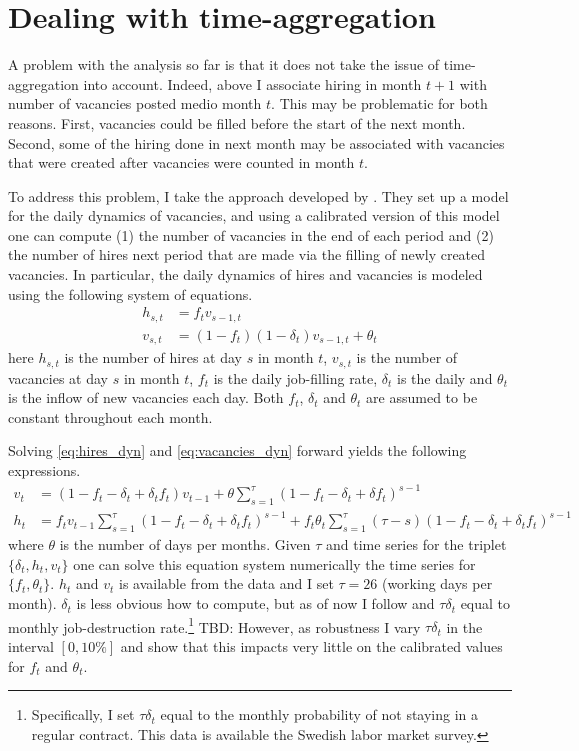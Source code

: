 \section{Dealing with time-aggregation}
\label{sec:time_agg}

A problem with the analysis so far is that it does not take the issue of time-aggregation into account. Indeed, above I associate hiring in month $t+1$ with number of vacancies posted medio month $t$. This may be problematic for both reasons. First, vacancies could be filled before the start of the next month. Second, some of the hiring done in next month may be associated with vacancies that were created after vacancies were counted in month $t$.

To address this problem, I take the approach developed by \cite{Davis2013}. They set up a model for the daily dynamics of vacancies, and using a calibrated version of this model one can compute (1) the number of vacancies in the end of each period and (2) the number of hires next period that are made via the filling of newly created vacancies. In particular, the daily dynamics of hires and vacancies is modeled using the following system of equations.
\begin{align}
h_{s,t}&=f_t v_{s-1,t} \label{eq:hires_dyn} \\
v_{s,t}&=(1-f_t)(1-\delta_t)v_{s-1,t} + \theta_t \label{eq:vacancies_dyn} 
\end{align}
here $h_{s,t}$ is the number of hires at day $s$ in month $t$, $v_{s,t}$ is the number of vacancies at day $s$ in month $t$, $f_t$ is the daily job-filling rate, $\delta_t$ is the daily and $\theta_t$ is the inflow of new vacancies each day. Both $f_t$, $\delta_t$ and $\theta_t$ are assumed to be constant throughout each month. 

Solving \ref{eq:hires_dyn} and \ref{eq:vacancies_dyn} forward yields the following expressions.
\begin{align}
v_t&=\left( 1-f_t-\delta_t+\delta_t f_t \right) v_{t-1} + \theta \sum_{s=1}^{\tau} \left( 1-f_t-\delta_t+\delta f_t \right)^{s-1} \\
h_t&=f_t v_{t-1} \sum_{s=1}^{\tau} \left( 1-f_t-\delta_t+\delta_t f_t \right)^{s-1} + f_t \theta_t \sum_{s=1}^{\tau} \left( \tau- s\right) \left( 1-f_t-\delta_t+\delta_t f_t \right)^{s-1}
\end{align}
where $\theta$ is the number of days per months. Given $\tau$ and time series for the triplet $\{\delta_t, h_t, v_t \}$ one can solve this equation system numerically the time series for $\{ f_t, \theta_t \}$. $h_t$ and $v_t$ is available from the data and I set $\tau=26$ (working days per month). $\delta_t$ is less obvious how to compute, but as of now I follow \cite{Davis2013} and $\tau \delta_t$ equal to monthly job-destruction rate.\footnote{Specifically, I set $\tau \delta_t$ equal to the monthly probability of not staying in a regular contract. This data is available the Swedish labor market survey.} TBD: However, as robustness I vary $\tau \delta_t$ in the interval $[0,10\%]$ and show that this impacts very little on the calibrated values for $f_t$ and $\theta_t$.

